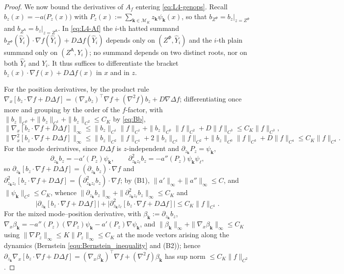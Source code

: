 \documentclass[a4paper,fleqn]{cas-sc}
\theoremstyle{definition}
\theoremstyle{remark}
\begin{document}
\begin{proof}
We now bound the derivatives of $A_f$ entering \eqref{eq:L4-genops}. Recall
$b_z(x)=-a\bigl(P_z(x)\bigr)$ with $P_z(x):=\sum_{\mathbf k\in\mathcal M_K}z_{\mathbf k}\psi_{\mathbf k}(x)$,
so that $b_{Z^\Phi}=b_z|_{z=Z^\Phi}$ and $b_{Z^{\mathsf A}}=b_z|_{z=Z^{\mathsf A}}$. In \eqref{eq:L4-Af}
the $i$-th hatted summand $b_{Z^\Phi}(\widehat Y_i)\!\cdot\!\nabla f(\widehat Y_i)+D\Delta f(\widehat Y_i)$
depends only on $(Z^\Phi,\widehat Y_i)$ and the $i$-th plain summand only on $(Z^{\mathsf A},Y_i)$; no summand
depends on two distinct roots, nor on both $\widehat Y_i$ and $Y_i$. It thus suffices to differentiate the
bracket $b_z(x)\!\cdot\!\nabla f(x)+D\Delta f(x)$ in $x$ and in $z$.

For the position derivatives, by the product rule
$\nabla_x[b_z\!\cdot\!\nabla f+D\Delta f]=(\nabla_x b_z)^{\!\top}\nabla f+(\nabla^2 f)b_z+D\nabla\Delta f$;
differentiating once more and grouping by the order of the $f$-factor, with
$\|b_z\|_{C^0}+\|b_z\|_{C^1}+\|b_z\|_{C^2}\le C_K$ by \eqref{eq:Bb},
\[
\bigl\|\nabla_x[b_z\!\cdot\!\nabla f+D\Delta f]\bigr\|_\infty
\le\|b_z\|_{C^1}\|f\|_{C^1}+\|b_z\|_{C^0}\|f\|_{C^2}+D\|f\|_{C^3}\le C_K\|f\|_{C^3},
\]
\[
\bigl\|\nabla_x^2[b_z\!\cdot\!\nabla f+D\Delta f]\bigr\|_\infty
\le\|b_z\|_{C^2}\|f\|_{C^1}+2\|b_z\|_{C^1}\|f\|_{C^2}+\|b_z\|_{C^0}\|f\|_{C^3}+D\|f\|_{C^4}\le C_K\|f\|_{C^4}.
\]
For the mode derivatives, since $D\Delta f$ is $z$-independent and $\partial_{z_{\mathbf k}}P_z=\psi_{\mathbf k}$,
\[
\partial_{z_{\mathbf k}}b_z=-a'(P_z)\psi_{\mathbf k},\qquad
\partial^2_{z_{\mathbf k}z_\ell}b_z=-a''(P_z)\psi_{\mathbf k}\psi_\ell,
\]
so $\partial_{z_{\mathbf k}}[b_z\!\cdot\!\nabla f+D\Delta f]=(\partial_{z_{\mathbf k}}b_z)\!\cdot\!\nabla f$ and
$\partial^2_{z_{\mathbf k}z_\ell}[b_z\!\cdot\!\nabla f+D\Delta f]=(\partial^2_{z_{\mathbf k}z_\ell}b_z)\!\cdot\!\nabla f$;
by (B1), $\|a'\|_\infty+\|a''\|_\infty\le C$, and $\|\psi_{\mathbf k}\|_{C^2}\le C_K$, whence
$\|\partial_{z_{\mathbf k}}b_z\|_\infty+\|\partial^2_{z_{\mathbf k}z_\ell}b_z\|_\infty\le C_K$ and
\[
\bigl|\partial_{z_{\mathbf k}}[b_z\!\cdot\!\nabla f+D\Delta f]\bigr|
+\bigl|\partial^2_{z_{\mathbf k}z_\ell}[b_z\!\cdot\!\nabla f+D\Delta f]\bigr|\le C_K\|f\|_{C^1}.
\]
For the mixed mode--position derivative, with $\beta_{\mathbf k}:=\partial_{z_{\mathbf k}}b_z$,
$\nabla_x\beta_{\mathbf k}=-a''(P_z)(\nabla P_z)\psi_{\mathbf k}-a'(P_z)\nabla\psi_{\mathbf k}$, and
$\|\beta_{\mathbf k}\|_\infty+\|\nabla_x\beta_{\mathbf k}\|_\infty\le C_K$ using
$\|\nabla P_z\|_\infty\le K\|P_z\|_\infty\le C_K$ at the mode vectors arising along the dynamics
(Bernstein \eqref{equ:Bernstein_inequality} and (B2)); hence
$\partial_{z_{\mathbf k}}\nabla_x[b_z\!\cdot\!\nabla f+D\Delta f]
=(\nabla_x\beta_{\mathbf k})^{\!\top}\nabla f+(\nabla^2 f)\beta_{\mathbf k}$ has sup norm $\le C_K\|f\|_{C^2}$.


\end{proof}
\end{document}
